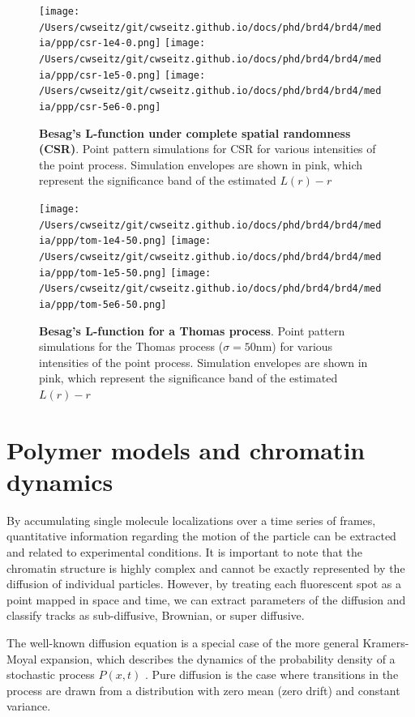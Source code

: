 \begin{figure}
\centering
\texttt{[image: /Users/cwseitz/git/cwseitz.github.io/docs/phd/brd4/brd4/media/ppp/csr-1e4-0.png]}
\texttt{[image: /Users/cwseitz/git/cwseitz.github.io/docs/phd/brd4/brd4/media/ppp/csr-1e5-0.png]}
\texttt{[image: /Users/cwseitz/git/cwseitz.github.io/docs/phd/brd4/brd4/media/ppp/csr-5e6-0.png]}
\caption{\textbf{Besag's L-function under complete spatial randomness (CSR)}. Point pattern simulations for CSR for various intensities of the point process. Simulation envelopes are shown in pink, which represent the significance band of the estimated $L(r)-r$}
\label{fig:fig17}
\end{figure}

\begin{figure}
\centering
\texttt{[image: /Users/cwseitz/git/cwseitz.github.io/docs/phd/brd4/brd4/media/ppp/tom-1e4-50.png]}
\texttt{[image: /Users/cwseitz/git/cwseitz.github.io/docs/phd/brd4/brd4/media/ppp/tom-1e5-50.png]}
\texttt{[image: /Users/cwseitz/git/cwseitz.github.io/docs/phd/brd4/brd4/media/ppp/tom-5e6-50.png]}
\caption{\textbf{Besag's L-function for a Thomas process}. Point pattern simulations for the Thomas process ($\sigma=50\mathrm{nm}$) for various intensities of the point process. Simulation envelopes are shown in pink, which represent the significance band of the estimated $L(r)-r$}
\label{fig:fig18}
\end{figure}
\clearpage


\section{Polymer models and chromatin dynamics}

By accumulating single molecule localizations over a time series of frames, quantitative information regarding the motion of the particle can be extracted and related to experimental conditions. It is important to note that the chromatin structure is highly complex and cannot be exactly represented by the diffusion of individual particles. However, by treating each fluorescent spot as a point mapped in space and time, we can extract parameters of the diffusion and classify tracks as sub-diffusive, Brownian, or super diffusive. 

The well-known diffusion equation is a special case of the more general Kramers-Moyal expansion, which describes the dynamics of the probability density of a stochastic process $P(x,t)$ \parencite{Gardiner2009}. Pure diffusion is the case where transitions in the process are drawn from a distribution with zero mean (zero drift) and constant variance. 

